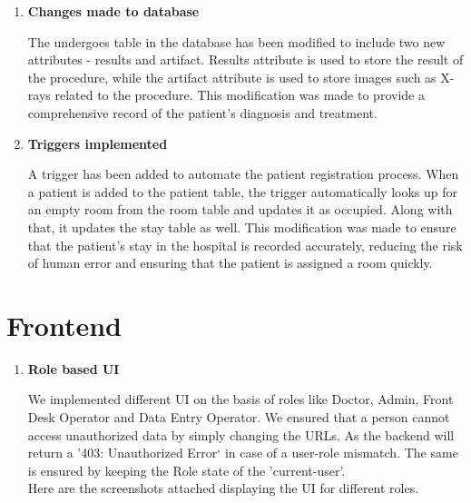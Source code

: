 \documentclass[12pt,a4paper]{article}
\begin{document}
{\begin{enumerate}
\newpage

\item \textbf{Changes made to database} 

The undergoes table in the database has been modified to include two new attributes - results and artifact. Results attribute is used to store the result of the procedure, while the artifact attribute is used to store images such as X-rays related to the procedure. This modification was made to provide a comprehensive record of the patient's diagnosis and treatment.
\\
\item \textbf{Triggers implemented} 

A trigger has been added to automate the patient registration process. When a patient is added to the patient table, the trigger automatically looks up for an empty room from the room table and updates it as occupied. Along with that, it updates the stay table as well. This modification was made to ensure that the patient's stay in the hospital is recorded accurately, reducing the risk of human error and ensuring that the patient is assigned a room quickly.
\\

\end{enumerate}
\section*{ \hspace{-2mm}Frontend}

\begin{enumerate}
\item \textbf{Role based UI}

We implemented different UI on the basis of roles like Doctor, Admin, Front Desk Operator and Data Entry Operator. We ensured that a person cannot access unauthorized data by simply changing the URLs. As the backend will return a '403: Unauthorized Error` in case of a user-role mismatch. The same is ensured by keeping the Role state of the 'current-user'.
\\
Here are the screenshots attached displaying the UI for different roles.
\\


\end{enumerate}}
\end{document}
